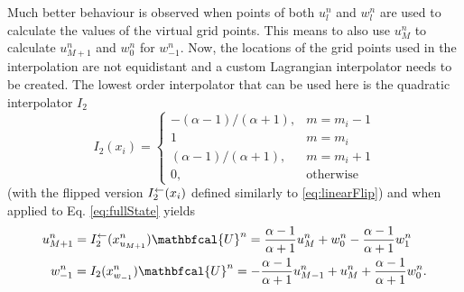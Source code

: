 Much better behaviour is observed when points of both $u_l^n$ and $w_l^n$ are used to calculate the values of the virtual grid points. This means to also use $u_M^n$ to calculate $u_{M+1}^n$ and $w_0^n$ for $w_{-1}^n$. Now, the locations of the grid points used in the interpolation are not equidistant and a custom Lagrangian interpolator needs to be created. The lowest order interpolator that can be used here is the quadratic interpolator $I_2$
\begin{equation}
    I_2(x_i) =
    \begin{cases}
        -(\alpha-1)/(\alpha + 1), & m = m_i-1\\
        1 & m = m_i\\
        (\alpha-1)/(\alpha + 1), & m = m_i+1\\
        0, & \text{otherwise}
    \end{cases}
\end{equation}
(with the flipped version $I_2^\leftarrow(x_i)$ defined similarly to \eqref{eq:linearFlip}) and when applied to Eq. \eqref{eq:fullState} yields
\begin{subequations}\label{eq:connectionInterpol}
\begin{align}
    &\begin{aligned}\label{eq:calcUMP1}
        u_{M+1}^n = I_2^\flip(x^n_{u_{M+1}})\mathbfcal{U}^n = \frac{\alpha - 1}{\alpha + 1}u_{M}^n + w_0^n - \frac{\alpha - 1}{\alpha + 1}w_1^n
    \end{aligned}\\
    &\ \ \begin{aligned}\label{eq:calcWM1}
        w_{-1}^n = I_2(x^n_{w_{-1}})\mathbfcal{U}^n
        =-\frac{\alpha - 1}{\alpha + 1}u_{M-1}^n + u_{M}^n+ \frac{\alpha - 1}{\alpha + 1}w_{0}^n.
    \end{aligned}
\end{align}
\end{subequations}
